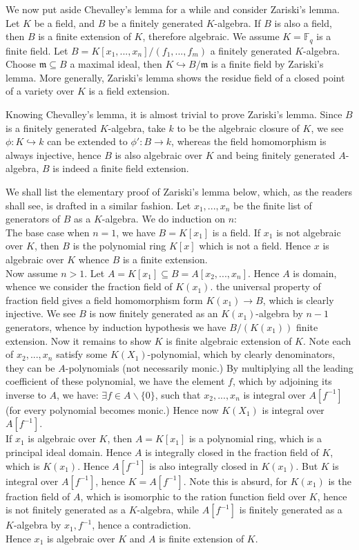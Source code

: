 \documentclass[12pt]{article}
\theoremstyle{definition}
\theoremstyle{plain}
\newcommand{\field}{\mathbb{F}}
\newcommand{\inj}{\hookrightarrow}
\begin{document}
\medskip
We now put aside Chevalley's lemma for a while and consider Zariski's lemma.
 Let $K$ be a field, and $B$ be a finitely generated $K$-algebra. If $B$ is also a field, then $B$ is a finite extension of $K$, therefore algebraic.
\Exe We assume $K=\field_q$ is a finite field. Let $B=K[x_1, ..., x_n]/(f_1, ..., f_m)$ a finitely generated $K$-algebra. Choose $\mathfrak{m}\subseteq B$ a maximal ideal, then $K\inj B/\mathfrak{m}$ is a finite field by Zariski's lemma.
\Rmk More generally, Zariski's lemma shows the residue field of a closed point of a variety over $K$ is a field extension.

Knowing Chevalley's lemma, it is almost trivial to prove Zariski's lemma. Since $B$ is a finitely generated $K$-algebra, take $k$ to be the algebraic closure of $K$, we see $\phi: K\inj k$ can be extended to $\phi':B\to k$, whereas the field homomorphism is always injective, hence $B$ is also algebraic over $K$ and being finitely generated $A$-algebra, $B$ is indeed a finite field extension.

\medskip
We shall list the elementary proof of Zariski's lemma below, which, as the readers shall see, is drafted in a similar fashion.
 Let $x_1, ..., x_n$ be the finite list of generators of $B$ as a $K$-algebra. We do induction on $n$:\\
\indent The base case when $n=1$, we have $B=K[x_1]$ is a field. If $x_1$ is not algebraic over $K$, then $B$ is the polynomial ring $K[x]$ which is not a field. Hence $x$ is algebraic over $K$ whence $B$ is a finite extension.\\
\indent Now assume $n>1$. Let $A=K[x_1]\subseteq B=A[x_2, ..., x_n]$. Hence $A$ is domain, whence we consider the fraction field of $K(x_1)$. the universal property of fraction field gives a field homomorphism form $K(x_1)\to B$, which is clearly injective. We see $B$ is now finitely generated as an $K(x_1)$-algebra by $n-1$ generators, whence by induction hypothesis we have $B/(K(x_1))$ finite extension. Now it remains to show $K$ is finite algebraic extension of $K$. Note each of $x_2, ..., x_n$ satisfy some $K(X_1)$-polynomial, which by clearly denominators, they can be $A$-polynomials (not necessarily monic.) By multiplying all the leading coefficient of these polynomial, we have the element $f$, which by adjoining its inverse to $A$, we have: $\exists f\in A\backslash\{0\}$, such that $x_2, ..., x_n$ is integral over $A[f^{-1}]$ (for every polynomial becomes monic.) Hence now $K(X_1)$ is integral over $A[f^{-1}]$.\\
\indent If $x_1$ is algebraic over $K$, then $A=K[x_1]$ is a polynomial ring, which is a principal ideal domain. Hence $A$ is integrally closed in the fraction field of $K$, which is $K(x_1)$. Hence $A[f^{-1}]$ is also integrally closed in $K(x_1)$. But $K$ is integral over $A[f^{-1}]$, hence $K=A[f^{-1}]$. Note this is absurd, for $K(x_1)$ is the fraction field of $A$, which is isomorphic to the ration function field over $K$, hence is not finitely generated as a $K$-algebra, while $A[f^{-1}]$ is finitely generated as a $K$-algebra by $x_1, f^{-1}$, hence a contradiction. \\
Hence $x_1$ is algebraic over $K$ and $A$ is finite extension of $K$.\qedhere
\end{document}
